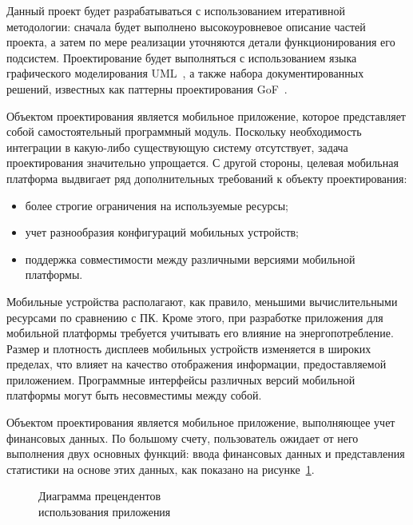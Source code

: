 Данный проект будет разрабатываться с использованием итеративной методологии:
сначала будет выполнено высокоуровневое описание частей проекта,
а затем по мере реализации уточняются детали функционирования его подсистем.
Проектирование будет выполняться с использованием языка графического
моделирования UML~\cite{fowler04}, а также набора документированных решений,
известных как паттерны проектирования GoF~\cite{gamma01}.

Объектом проектирования является мобильное приложение,
которое представляет собой самостоятельный программный модуль.
Поскольку необходимость интеграции в какую-либо существующую
систему отсутствует, задача проектирования значительно упрощается.
С другой стороны, целевая мобильная платформа выдвигает ряд дополнительных
требований к объекту проектирования:
\begin{itemize}
\item более строгие ограничения на используемые ресурсы;
\item учет разнообразия конфигураций мобильных устройств;
\item поддержка совместимости между различными версиями
  мобильной платформы.
\end{itemize}

Мобильные устройства располагают, как правило, меньшими вычислительными
ресурсами по сравнению с ПК. Кроме этого, при разработке приложения для
мобильной платформы требуется учитывать его влияние на энергопотребление.
Размер и плотность дисплеев мобильных устройств изменяется в широких пределах,
что влияет на качество отображения информации, предоставляемой приложением.
Программные интерфейсы различных версий мобильной платформы
могут быть несовместимы между собой.

Объектом проектирования является мобильное приложение,
выполняющее учет финансовых данных. По большому счету, пользователь
ожидает от него выполнения двух основных функций:
ввода финансовых данных и представления статистики на основе этих данных,
как показано на рисунке~\ref{fig:design_use_cases}.

\begin{figure}[h!]
  \centering
  \caption{Диаграмма прецендентов \\ использования приложения}
  \label{fig:design_use_cases}
\end{figure}

